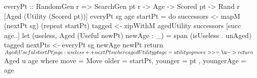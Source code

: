 everyPt :: RandomGen r
        => SearchGen pt r -> Age -> Scored pt
        -> Rand r [Aged (Utility (Scored pt))]
everyPt sg age startPt = do
  successors <- mapM (nextPt sg) (repeat startPt)
  tagged <- zipWithM agedUtility successors [succ age..]
  let (useless, Aged (Useful newPt) newAge : _) =
                        span (isUseless . unAged) tagged
  nextPts <- everyPt sg newAge newPt
  return $ Aged (Useful startPt) age : useless ++ nextPts

  where agedUtility pt age =
           utility sg move >>= \u -> return $ Aged u age
         where move = Move { older = startPt, younger = pt
                           , youngerAge = age }
